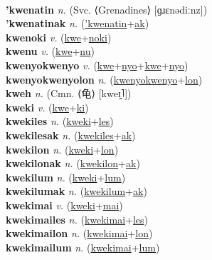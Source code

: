  \label{kwelwelsomaluat} \\
\textbf{'kwenatin} \textit{n.} (Svc. ⟨Grenadines⟩ [ɡɹɛnədiːnz])
 \label{'kwenatin} \\
\textbf{'kwenatinak} \textit{n.} (\hyperref['kwenatin]{'kwenatin}+\hyperref[ak]{ak})
 \label{'kwenatinak} \\
\textbf{kwenoki} \textit{v.} (\hyperref[kwe]{kwe}+\hyperref[noki]{noki})
 \label{kwenoki} \\
\textbf{kwenu} \textit{v.} (\hyperref[kwe]{kwe}+\hyperref[nu]{nu})
 \label{kwenu} \\
\textbf{kwenyokwenyo} \textit{v.} (\hyperref[kwe]{kwe}+\hyperref[nyo]{nyo}+\hyperref[kwe]{kwe}+\hyperref[nyo]{nyo})
 \label{kwenyokwenyo} \\
\textbf{kwenyokwenyolon} \textit{n.} (\hyperref[kwenyokwenyo]{kwenyokwenyo}+\hyperref[lon]{lon})
 \label{kwenyokwenyolon} \\
\textbf{kweh} \textit{n.} (Cmn. ⟨龟⟩ [kweɪ̯˥])
 \label{kweh} \\
\textbf{kweki} \textit{v.} (\hyperref[kwe]{kwe}+\hyperref[ki]{ki})
 \label{kweki} \\
\textbf{kwekiles} \textit{n.} (\hyperref[kweki]{kweki}+\hyperref[les]{les})
 \label{kwekiles} \\
\textbf{kwekilesak} \textit{n.} (\hyperref[kwekiles]{kwekiles}+\hyperref[ak]{ak})
 \label{kwekilesak} \\
\textbf{kwekilon} \textit{n.} (\hyperref[kweki]{kweki}+\hyperref[lon]{lon})
 \label{kwekilon} \\
\textbf{kwekilonak} \textit{n.} (\hyperref[kwekilon]{kwekilon}+\hyperref[ak]{ak})
 \label{kwekilonak} \\
\textbf{kwekilum} \textit{n.} (\hyperref[kweki]{kweki}+\hyperref[lum]{lum})
 \label{kwekilum} \\
\textbf{kwekilumak} \textit{n.} (\hyperref[kwekilum]{kwekilum}+\hyperref[ak]{ak})
 \label{kwekilumak} \\
\textbf{kwekimai} \textit{v.} (\hyperref[kweki]{kweki}+\hyperref[mai]{mai})
 \label{kwekimai} \\
\textbf{kwekimailes} \textit{n.} (\hyperref[kwekimai]{kwekimai}+\hyperref[les]{les})
 \label{kwekimailes} \\
\textbf{kwekimailon} \textit{n.} (\hyperref[kwekimai]{kwekimai}+\hyperref[lon]{lon})
 \label{kwekimailon} \\
\textbf{kwekimailum} \textit{n.} (\hyperref[kwekimai]{kwekimai}+\hyperref[lum]{lum})
 \label{kwekimailum} \\
